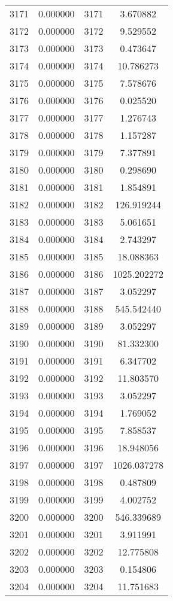\documentclass[12pt]{article}
\begin{document}
\begin{longtable}{@{}cccc@{}}
3171 & 0.000000 & 3171 & 3.670882 \\
3172 & 0.000000 & 3172 & 9.529552 \\
3173 & 0.000000 & 3173 & 0.473647 \\
3174 & 0.000000 & 3174 & 10.786273 \\
3175 & 0.000000 & 3175 & 7.578676 \\
3176 & 0.000000 & 3176 & 0.025520 \\
3177 & 0.000000 & 3177 & 1.276743 \\
3178 & 0.000000 & 3178 & 1.157287 \\
3179 & 0.000000 & 3179 & 7.377891 \\
3180 & 0.000000 & 3180 & 0.298690 \\
3181 & 0.000000 & 3181 & 1.854891 \\
3182 & 0.000000 & 3182 & 126.919244 \\
3183 & 0.000000 & 3183 & 5.061651 \\
3184 & 0.000000 & 3184 & 2.743297 \\
3185 & 0.000000 & 3185 & 18.088363 \\
3186 & 0.000000 & 3186 & 1025.202272 \\
3187 & 0.000000 & 3187 & 3.052297 \\
3188 & 0.000000 & 3188 & 545.542440 \\
3189 & 0.000000 & 3189 & 3.052297 \\
3190 & 0.000000 & 3190 & 81.332300 \\
3191 & 0.000000 & 3191 & 6.347702 \\
3192 & 0.000000 & 3192 & 11.803570 \\
3193 & 0.000000 & 3193 & 3.052297 \\
3194 & 0.000000 & 3194 & 1.769052 \\
3195 & 0.000000 & 3195 & 7.858537 \\
3196 & 0.000000 & 3196 & 18.948056 \\
3197 & 0.000000 & 3197 & 1026.037278 \\
3198 & 0.000000 & 3198 & 0.487809 \\
3199 & 0.000000 & 3199 & 4.002752 \\
3200 & 0.000000 & 3200 & 546.339689 \\
3201 & 0.000000 & 3201 & 3.911991 \\
3202 & 0.000000 & 3202 & 12.775808 \\
3203 & 0.000000 & 3203 & 0.154806 \\
3204 & 0.000000 & 3204 & 11.751683 \\

\end{longtable}
\end{document}

